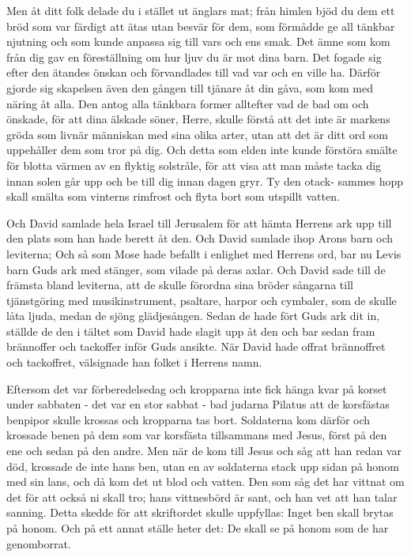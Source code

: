 
Men åt ditt folk delade du i stället ut änglars mat; från himlen bjöd du dem
ett bröd som var färdigt att ätas utan besvär för dem, som förmådde ge all tänkbar njutning och som kunde anpassa sig till vars och ens smak. Det ämne som
kom från dig gav en föreställning om hur ljuv du är mot dina barn. Det fogade
sig efter den ätandes önskan och förvandlades till vad var och en ville ha. 
Därför gjorde sig skapelsen även den gången till tjänare åt din gåva, som kom
med näring åt alla. Den antog alla tänkbara former alltefter vad de bad om och
önskade, för att dina älskade söner, Herre, skulle förstå att det inte är markens gröda som livnär människan med sina olika arter, utan att det är ditt ord
som uppehåller dem som tror på dig. Och detta som elden inte kunde förstöra
smälte för blotta värmen av en flyktig solstråle, för att visa att man måste
tacka dig innan solen går upp och be till dig innan dagen gryr. Ty den otack-
sammes hopp skall smälta som vinterns rimfrost och flyta bort som utspillt vatten.



Och David samlade hela Israel till Jerusalem för att hämta Herrens ark upp till den plats som han hade berett åt den. 
Och David samlade ihop Arons barn och leviterna; 
Och så som Mose hade befallt i enlighet med Herrens ord, bar nu Levis barn Guds ark med stänger, som vilade på deras axlar.
Och David sade till de främsta bland leviterna, att de skulle förordna sina bröder sångarna till tjänstgöring med musikinstrument, psaltare, harpor och cymbaler, som de skulle låta ljuda, medan de sjöng glädjesången. 
Sedan de hade fört Guds ark dit in, ställde de den i tältet som David hade slagit upp åt den och bar sedan fram brännoffer och tackoffer inför Guds ansikte. 
När David hade offrat brännoffret och tackoffret, välsignade han folket i Herrens namn.



Eftersom det var förberedelsedag och kropparna inte fick hänga kvar på korset under sabbaten - det var en stor sabbat - bad judarna Pilatus att de korsfästas benpipor skulle krossas och kropparna tas bort. 
Soldaterna kom därför och krossade benen på dem som var korsfästa tillsammans med Jesus, först på den ene och sedan på den andre. 
Men när de kom till Jesus och såg att han redan var död, krossade de inte hans ben, utan en av soldaterna stack upp sidan på honom med sin lans, och då kom det ut blod och vatten. 
Den som såg det har vittnat om det för att också ni skall tro; hans vittnesbörd är sant, och han vet att han talar sanning. 
Detta skedde för att skriftordet skulle uppfyllas: Inget ben skall brytas på honom. 
Och på ett annat ställe heter det: De skall se på honom som de har genomborrat.


